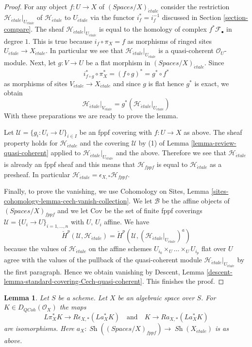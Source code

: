 \documentclass{stacks-project}
\theoremstyle{plain}
\newtheorem{lemma}[subsection]{Lemma}
\theoremstyle{definition}
\theoremstyle{remark}
\numberwithin{equation}{subsection}
\def\Sh{\mathop{\mathit{Sh}}\nolimits}
\def\etale{{\acute{e}tale}}
\def\QCoh{\mathit{QCoh}}
\begin{document}
\begin{proof}
For any object $f : U \to X$ of $(\textit{Spaces}/X)_\etale$
consider the restriction
$\mathcal{H}_\etale|_{U_\etale}$ of $\mathcal{H}_\etale$ to $U_\etale$ via
the functor $i_f^* = i_f^{-1}$ discussed in Section \ref{section-compare}.
The sheaf $\mathcal{H}_\etale|_{U_\etale}$
is equal to the homology of complex $f^*\mathcal{F}_\bullet$ in degree $1$.
This is true because $i_f \circ \pi_X = f$ as morphisms of ringed sites
$U_\etale \to X_\etale$. In particular we see that
$\mathcal{H}_\etale|_{U_\etale}$ is a quasi-coherent $\mathcal{O}_U$-module.
Next, let $g : V \to U$ be a flat
morphism in $(\textit{Spaces}/X)_\etale$. Since
$$
i_{f \circ g}^* \circ \pi_X^* = (f \circ g)^* = g^* \circ f^*
$$
as morphisms of sites $V_\etale \to X_\etale$ and since $g$ is flat
hence $g^*$ is exact, we obtain
$$
\mathcal{H}_\etale|_{V_\etale} =
g^*\left(\mathcal{H}_\etale|_{U_\etale}\right)
$$
With these preparations we are ready to prove the lemma.

\medskip\noindent
Let $\mathcal{U} = \{g_i : U_i \to U\}_{i \in I}$ be an fppf covering
with $f : U \to X$ as above. The sheaf property holds for
$\mathcal{H}_\etale$ and the covering $\mathcal{U}$
by (1) of Lemma \ref{lemma-review-quasi-coherent}
applied to $\mathcal{H}_\etale|_{U_\etale}$ and the above.
Therefore we see that $\mathcal{H}_\etale$ is already an fppf
sheaf and this means that $\mathcal{H}_{fppf}$ is
equal to $\mathcal{H}_\etale$
as a presheaf. In particular
$\mathcal{H}_\etale = \epsilon_{X, *}\mathcal{H}_{fppf}$.

\medskip\noindent
Finally, to prove the vanishing, we use
Cohomology on Sites, Lemma \ref{sites-cohomology-lemma-cech-vanish-collection}.
We let $\mathcal{B}$ be the affine objects of
$(\textit{Spaces}/X)_{fppf}$ and we let
$\text{Cov}$ be the set of finite fppf coverings
$\mathcal{U} = \{U_i \to U\}_{i = 1, \ldots, n}$ with $U$, $U_i$ affine.
We have
$$
{\check H}^p(\mathcal{U}, \mathcal{H}_\etale) =
{\check H}^p(\mathcal{U}, \left(\mathcal{H}_\etale|_{U_\etale}\right)^a)
$$
because the values of $\mathcal{H}_\etale$ on the
affine schemes $U_{i_0} \times_U \ldots \times_U U_{i_p}$
flat over $U$ agree with the values of the pullback
of the quasi-coherent module $\mathcal{H}_\etale|_{U_\etale}$ by
the first paragraph. Hence we obtain vanishing by
Descent, Lemma \ref{descent-lemma-standard-covering-Cech-quasi-coherent}.
This finishes the proof.
\end{proof}

\begin{lemma}
\label{lemma-cohomological-descent-etale-fppf-modules-unbounded}
Let $S$ be a scheme. Let $X$ be an algebraic space over $S$.
For $K \in D_\QCoh(\mathcal{O}_X)$ the maps
$$
L\pi_X^*K \longrightarrow R\epsilon_{X, *}(La_X^*K)
\quad\text{and}\quad
K \longrightarrow Ra_{X, *}(La_X^*K)
$$
are isomorphisms. Here
$a_X : \Sh((\textit{Spaces}/X)_{fppf}) \to \Sh(X_\etale)$ is as above.
\end{lemma}
\end{document}

